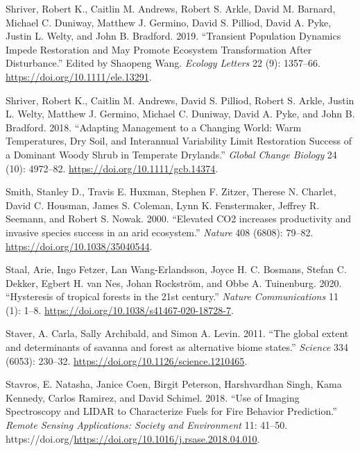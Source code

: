 \documentclass[
  12pt,
]{article}
\newlength{\cslhangindent}
\newlength{\cslentryspacingunit} %
\newenvironment{CSLReferences}[2] %
 {%
  \setlength{\parindent}{0pt}
  \ifodd #1
  \let\oldpar\par
  \def\par{\hangindent=\cslhangindent\oldpar}
  \fi
  \setlength{\parskip}{#2\cslentryspacingunit}
 }%
 {}
\begin{document}
\begin{CSLReferences}{1}{0}
\leavevmode{}%
Shriver, Robert K., Caitlin M. Andrews, Robert S. Arkle, David M.
Barnard, Michael C. Duniway, Matthew J. Germino, David S. Pilliod, David
A. Pyke, Justin L. Welty, and John B. Bradford. 2019. {``Transient
Population Dynamics Impede Restoration and May Promote Ecosystem
Transformation After Disturbance.''} Edited by Shaopeng Wang.
\emph{Ecology Letters} 22 (9): 1357--66.
\url{https://doi.org/10.1111/ele.13291}.

\leavevmode{}%
Shriver, Robert K., Caitlin M. Andrews, David S. Pilliod, Robert S.
Arkle, Justin L. Welty, Matthew J. Germino, Michael C. Duniway, David A.
Pyke, and John B. Bradford. 2018. {``Adapting Management to a Changing
World: {Warm} Temperatures, Dry Soil, and Interannual Variability Limit
Restoration Success of a Dominant Woody Shrub in Temperate Drylands.''}
\emph{Global Change Biology} 24 (10): 4972--82.
\url{https://doi.org/10.1111/gcb.14374}.

\leavevmode{}%
Smith, Stanley D., Travis E. Huxman, Stephen F. Zitzer, Therese N.
Charlet, David C. Housman, James S. Coleman, Lynn K. Fenstermaker,
Jeffrey R. Seemann, and Robert S. Nowak. 2000. {``{Elevated CO2
increases productivity and invasive species success in an arid
ecosystem}.''} \emph{Nature} 408 (6808): 79--82.
\url{https://doi.org/10.1038/35040544}.

\leavevmode{}%
Staal, Arie, Ingo Fetzer, Lan Wang-Erlandsson, Joyce H. C. Bosmans,
Stefan C. Dekker, Egbert H. van Nes, Johan Rockström, and Obbe A.
Tuinenburg. 2020. {``{Hysteresis of tropical forests in the 21st
century}.''} \emph{Nature Communications} 11 (1): 1--8.
\url{https://doi.org/10.1038/s41467-020-18728-7}.

\leavevmode{}%
Staver, A. Carla, Sally Archibald, and Simon A. Levin. 2011. {``{The
global extent and determinants of savanna and forest as alternative
biome states}.''} \emph{Science} 334 (6053): 230--32.
\url{https://doi.org/10.1126/science.1210465}.

\leavevmode{}%
Stavros, E. Natasha, Janice Coen, Birgit Peterson, Harshvardhan Singh,
Kama Kennedy, Carlos Ramirez, and David Schimel. 2018. {``Use of Imaging
Spectroscopy and {LIDAR} to Characterize Fuels for Fire Behavior
Prediction.''} \emph{Remote Sensing Applications: Society and
Environment} 11: 41--50.
https://doi.org/\url{https://doi.org/10.1016/j.rsase.2018.04.010}.


\end{CSLReferences}
\end{document}
